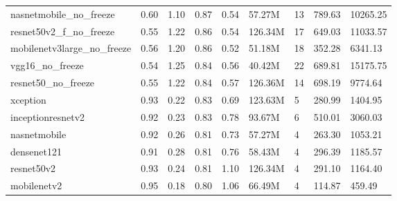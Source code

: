 \documentclass[10pt,a4paper,twocolumn,twoside]{article}
\begin{document}
\begin{table}[h]
\begin{tabular}{@{}lllllllll@{}}
  nasnetmobile\_no\_freeze            & 0.60                    & 1.10                & 0.87                  & 0.54              & 57.27M          & 13              & 789.63                  & 10265.25          \\
  resnet50v2\_f\_no\_freeze           & 0.55                    & 1.22                & 0.86                  & 0.54              & 126.34M         & 17              & 649.03                  & 11033.57          \\
  mobilenetv3large\_no\_freeze        & 0.56                    & 1.20                & 0.86                  & 0.52              & 51.18M          & 18              & 352.28                  & 6341.13           \\
  vgg16\_no\_freeze                   & 0.54                    & 1.25                & 0.84                  & 0.56              & 40.42M          & 22              & 689.81                  & 15175.75          \\
  resnet50\_no\_freeze                & 0.55                    & 1.22                & 0.84                  & 0.57              & 126.36M         & 14              & 698.19                  & 9774.64           \\
  xception                            & 0.93                    & 0.22                & 0.83                  & 0.69              & 123.63M         & 5               & 280.99                  & 1404.95           \\
  inceptionresnetv2                   & 0.92                    & 0.23                & 0.83                  & 0.78              & 93.67M          & 6               & 510.01                  & 3060.03           \\
  nasnetmobile                        & 0.92                    & 0.26                & 0.81                  & 0.73              & 57.27M          & 4               & 263.30                  & 1053.21           \\
  densenet121                         & 0.91                    & 0.28                & 0.81                  & 0.76              & 58.43M          & 4               & 296.39                  & 1185.57           \\
  resnet50v2                          & 0.93                    & 0.24                & 0.81                  & 1.10              & 126.34M         & 4               & 291.10                  & 1164.40           \\
  mobilenetv2                         & 0.95                    & 0.18                & 0.80                  & 1.06              & 66.49M          & 4               & 114.87                  & 459.49            \\

\end{tabular}
\end{table}
\end{document}

